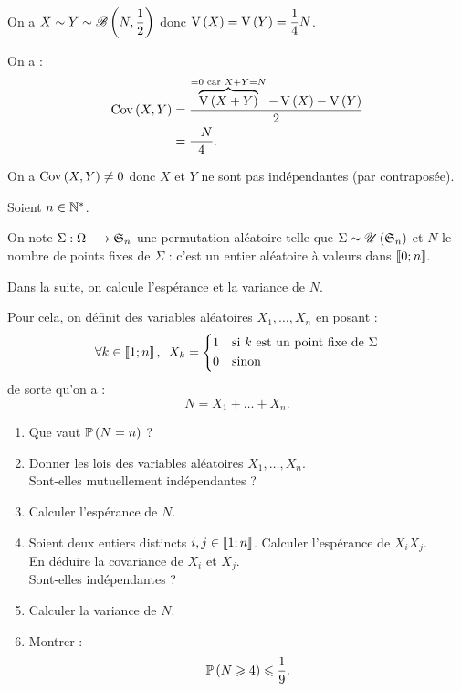 \begin{corr}[1]~\\
On a \(X\sim Y\sim \loibinomiale{N}{\dfrac{1}{2}}\) donc \(\vari{X}=\vari{Y}=\dfrac{1}{4}N\).

On a : \[\begin{aligned}
\cov{X}{Y}&=\dfrac{\overbrace{\vari{X+Y}}^{=0\text{ car }X+Y=N}-\vari{X}-\vari{Y}}{2} \\
&=\dfrac{-N}{4}.
\end{aligned}\]
\end{corr}

\begin{corr}[2]
On a \(\cov{X}{Y}\not=0\) donc \(X\) et \(Y\) ne sont pas indépendantes (par contraposée).
\end{corr}

\begin{exo}[Exercice 12]
Soient \(n\in\Ns\).

On note \(\Sigma:\Omega\to\S{n}\) une permutation aléatoire telle que \(\Sigma\sim\loiuniforme{\S{n}}\) et \(N\) le nombre de points fixes de \(\Sigma\) : c'est un entier aléatoire à valeurs dans \(\interventierii{0}{n}\).

Dans la suite, on calcule l'espérance et la variance de \(N\).

Pour cela, on définit des variables aléatoires \(X_1,\dots,X_n\) en posant : \[\quantifs{\forall k\in\interventierii{1}{n}}X_k=\begin{dcases}
1 &\text{si }k\text{ est un point fixe de }\Sigma \\
0 &\text{sinon}
\end{dcases}\] de sorte qu'on a : \[N=X_1+\dots+X_n.\]

\begin{enumerate}
    \item Que vaut \(\proba{N=n}\) ? \\
    \item Donner les lois des variables aléatoires \(X_1,\dots,X_n\). \\ Sont-elles mutuellement indépendantes ? \\
    \item Calculer l'espérance de \(N\). \\
    \item Soient deux entiers distincts \(i,j\in\interventierii{1}{n}\). Calculer l'espérance de \(X_iX_j\). \\ En déduire la covariance de \(X_i\) et \(X_j\). \\ Sont-elles indépendantes ? \\
    \item Calculer la variance de \(N\). \\
    \item Montrer : \[\proba{N\geq4}\leq\dfrac{1}{9}.\]
\end{enumerate}
\end{exo}

